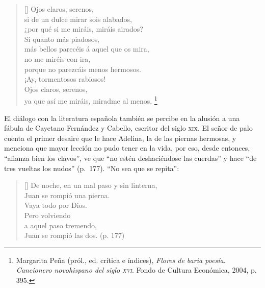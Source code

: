 \documentclass[14pt,twoside,final]{extbook} %
\let\oldfootnote\footnote
\renewcommand\footnote[1]{%
\oldfootnote{\hspace{1mm}#1}}
\begin{document}
\begin{verse}[\versewidth]
Ojos claros, serenos, \\
si de un dulce mirar sois alabados, \\
¿por qué si me miráis, miráis airados? \\
Si quanto más piadosos, \\
más bellos parecéis á aquel que os mira, \\
no me miréis con ira, \\
porque no parezcáis menos hermosos. \\
¡Ay, tormentosos rabiosos! \\
Ojos claros, serenos, \\
ya que así me miráis, miradme al menos.\footnote{Margarita Peña (pról., ed. crítica e índices), \emph{Flores de baria poesía. Cancionero novohispano del siglo \textsc{xvi}}. Fondo de Cultura Económica, 2004, p. 395.}
\end{verse}
El diálogo con la literatura española también se percibe en la alusión a una fábula de Cayetano Fernández y Cabello, escritor del siglo \textsc{xix}. El señor de palo cuenta el primer desaire que le hace Adelina, la de las piernas hermosas, y menciona que mayor lección no pudo tener en la vida, por eso, desde entonces, ``afianza bien los clavos'', ve que ``no estén deshaciéndose las cuerdas'' y hace ``de tres vueltas los nudos'' (p.~177). ``No sea que se repita'':\pagebreak[4]
\settowidth{\versewidth}{De noche, en un mal paso y sin linterna,}
\begin{verse}[\versewidth]
De noche, en un mal paso y sin linterna, \\
Juan se rompió una pierna. \\
Vaya todo por Dios. \\
Pero volviendo \\
a aquel paso tremendo, \\
Juan se rompió las dos. (p. 177)
\end{verse}
\end{document}
